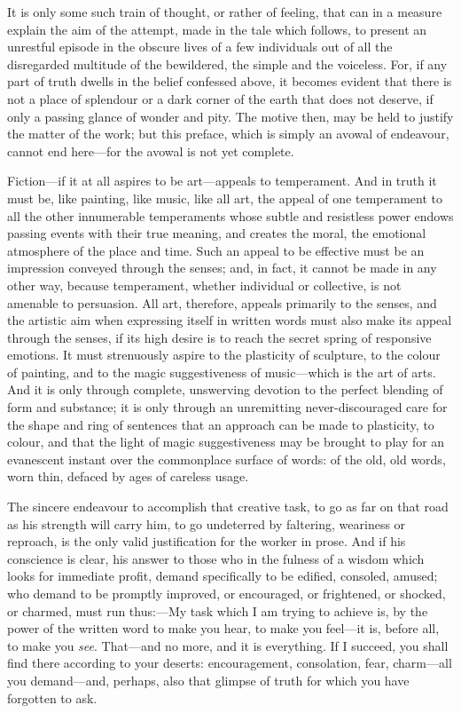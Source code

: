 It is only some such train of thought, or rather of feeling, that can in
a measure explain the aim of the attempt, made in the tale which
follows, to present an unrestful episode in the obscure lives of a few
individuals out of all the disregarded multitude of the bewildered, the
simple and the voiceless. For, if any part of truth dwells in the belief
confessed above, it becomes evident that there is not a place of
splendour or a dark corner of the earth that does not deserve, if only a
passing glance of wonder and pity. The motive then, may be held to
justify the matter of the work; but this preface, which is simply an
avowal of endeavour, cannot end here---for the avowal is not yet
complete.

Fiction---if it at all aspires to be art---appeals to temperament. And
in truth it must be, like painting, like music, like all art, the appeal
of one temperament to all the other innumerable temperaments whose
subtle and resistless power endows passing events with their true
meaning, and creates the moral, the emotional atmosphere of the place
and time. Such an appeal to be effective must be an impression conveyed
through the senses; and, in fact, it cannot be made in any other way,
because temperament, whether individual or collective, is not amenable
to persuasion. All art, therefore, appeals primarily to the senses, and
the artistic aim when expressing itself in written words must also make
its appeal through the senses, if its high desire is to reach the secret
spring of responsive emotions. It must strenuously aspire to the
plasticity of sculpture, to the colour of painting, and to the magic
suggestiveness of music---which is the art of arts. And it is only
through complete, unswerving devotion to the perfect blending of form
and substance; it is only through an unremitting never-discouraged care
for the shape and ring of sentences that an approach can be made to
plasticity, to colour, and that the light of magic suggestiveness may be
brought to play for an evanescent instant over the commonplace surface
of words: of the old, old words, worn thin, defaced by ages of careless
usage.

The sincere endeavour to accomplish that creative task, to go as far on
that road as his strength will carry him, to go undeterred by faltering,
weariness or reproach, is the only valid justification for the worker in
prose. And if his conscience is clear, his answer to those who in the
fulness of a wisdom which looks for immediate profit, demand
specifically to be edified, consoled, amused; who demand to be promptly
improved, or encouraged, or frightened, or shocked, or charmed, must run
thus:---My task which I am trying to achieve is, by the power of the
written word to make you hear, to make you feel---it is, before all, to
make you \emph{see}. That---and no more, and it is everything. If I
succeed, you shall find there according to your deserts: encouragement,
consolation, fear, charm---all you demand---and, perhaps, also that
glimpse of truth for which you have forgotten to ask.

